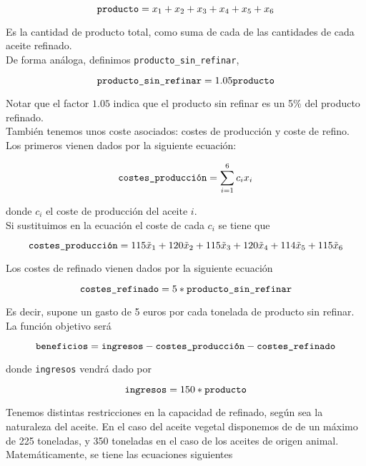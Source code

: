 \documentclass[12pt,a4paper,twoside,openright,titlepage,final]{article}
\begin{document}
\[ \text{\texttt{producto}} = x_1 + x_2 + x_3 + x_4 + x_5 + x_6 \]

Es la cantidad de producto total, como suma de cada de las cantidades de cada aceite refinado.\\

De forma análoga, definimos \texttt{producto\_sin\_refinar}, 

\[ \text{\texttt{producto\_sin\_refinar}} = 1.05\text{\texttt{producto}}\]

Notar que el factor $1.05$ indica que el producto sin refinar es un 5\% del producto refinado.\\

También tenemos unos coste asociados: costes de producción y coste de refino. Los primeros vienen dados por la siguiente ecuación:

\[ \text{\texttt{costes\_producción}} = \sum_{i=1}^{6} c_i x_i \]

donde $c_i$ el coste de producción del aceite $i$.\\

Si sustituimos en la ecuación el coste de cada $c_i$ se tiene que

\[ \text{\texttt{costes\_producción}} = 115\tilde{x}_1 + 120\tilde{x}_2 + 115\tilde{x}_3 + 120\tilde{x}_4 + 114\tilde{x}_5 + 115\tilde{x}_6 \]

Los costes de refinado vienen dados por la siguiente ecuación

\[ \text{\texttt{costes\_refinado}} = 5*\text{\texttt{producto\_sin\_refinar}} \]

Es decir, supone un gasto de 5 euros por cada tonelada de producto sin refinar.\\

La función objetivo será 

\[ \text{\texttt{beneficios}} = \text{\texttt{ingresos}} - \text{\texttt{costes\_producción}} - \text{\texttt{costes\_refinado}} \]

donde \texttt{ingresos} vendrá dado por

\[ \text{\texttt{ingresos}} = 150*\text{\texttt{producto}} \]

Tenemos distintas restricciones en la capacidad de refinado, según sea la naturaleza del aceite. En el caso del aceite vegetal disponemos de de un máximo de 225 toneladas, y 350 toneladas en el caso de los aceites de origen animal.\\

Matemáticamente, se tiene las ecuaciones siguientes
\end{document}
